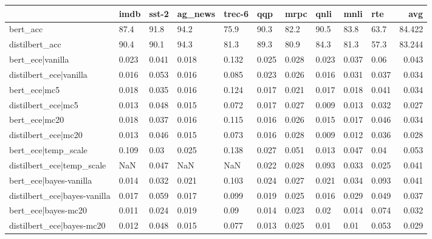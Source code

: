 \begin{tabular}{llllllllllr}
\toprule
{} &   imdb &  sst-2 & ag\_news & trec-6 &    qqp &   mrpc &   qnli &   mnli &    rte &     avg \\
\midrule
bert\_acc                     &   87.4 &   91.8 &    94.2 &   75.9 &   90.3 &   82.2 &   90.5 &   83.8 &   63.7 &  84.422 \\
distilbert\_acc               &   90.4 &   90.1 &    94.3 &   81.3 &   89.3 &   80.9 &   84.3 &   81.3 &   57.3 &  83.244 \\
bert\_ece|vanilla             &  0.023 &  0.041 &   0.018 &  0.132 &  0.025 &  0.028 &  0.023 &  0.037 &   0.06 &   0.043 \\
distilbert\_ece|vanilla       &  0.016 &  0.053 &   0.016 &  0.085 &  0.023 &  0.026 &  0.016 &  0.031 &  0.037 &   0.034 \\
bert\_ece|mc5                 &  0.018 &  0.035 &   0.016 &  0.124 &  0.017 &  0.021 &  0.017 &  0.018 &  0.041 &   0.034 \\
distilbert\_ece|mc5           &  0.013 &  0.048 &   0.015 &  0.072 &  0.017 &  0.027 &  0.009 &  0.013 &  0.032 &   0.027 \\
bert\_ece|mc20                &  0.018 &  0.037 &   0.016 &  0.115 &  0.016 &  0.026 &  0.015 &  0.017 &  0.046 &   0.034 \\
distilbert\_ece|mc20          &  0.013 &  0.046 &   0.015 &  0.073 &  0.016 &  0.028 &  0.009 &  0.012 &  0.036 &   0.028 \\
bert\_ece|temp\_scale          &  0.109 &   0.03 &   0.025 &  0.138 &  0.027 &  0.051 &  0.013 &  0.047 &   0.04 &   0.053 \\
distilbert\_ece|temp\_scale    &    NaN &  0.047 &     NaN &    NaN &  0.022 &  0.028 &  0.093 &  0.033 &  0.025 &   0.041 \\
bert\_ece|bayes-vanilla       &  0.014 &  0.032 &   0.021 &  0.103 &  0.024 &  0.027 &  0.021 &  0.034 &  0.093 &   0.041 \\
distilbert\_ece|bayes-vanilla &  0.017 &  0.059 &   0.017 &  0.099 &  0.019 &  0.025 &  0.016 &  0.029 &  0.049 &   0.037 \\
bert\_ece|bayes-mc20          &  0.011 &  0.024 &   0.019 &   0.09 &  0.014 &  0.023 &   0.02 &  0.014 &  0.074 &   0.032 \\
distilbert\_ece|bayes-mc20    &  0.012 &  0.048 &   0.015 &  0.077 &  0.013 &  0.025 &   0.01 &   0.01 &  0.053 &   0.029 \\
\bottomrule
\end{tabular}
